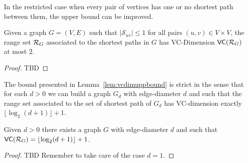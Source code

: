 In the restricted case when every pair of vertices has one or no shortest path
between them, the upper bound can be improved.
\begin{lemma}\label{lem:vcdimuppboundunique}
  Given a graph $G=(V,E)$ such that $|\mathcal{S}_{uv}|\le1$ for all pairs
  $(u,v)\in V\times V$, the range set $\mathcal{R}_G$ associated to the shortest
  paths in $G$ has VC-Dimension $\mathsf{VC}(\mathcal{R}_G)$ at most $2$.
\end{lemma}

\begin{proof}
  \XXX TBD \MR
\end{proof}

The bound presented in Lemma~\ref{lem:vcdimuppbound} is strict in the sense that
for each $d>0$ we can build a graph $G_d$ with edge-diameter $d$ and such
that the range set associated to the set of shortest path of $G_d$ has
VC-dimension exactly $\lfloor\log_2(d+1)\rfloor+1$.

\begin{lemma}
  Given $d>0$ there exists a graph $G$ with edge-diameter $d$ and such that
  $\mathsf{VC}(\mathcal{R}_G)=\lfloor\log_2(d+1)\rfloor+1$.
\end{lemma}

\begin{proof}
  \XXX TBD Remember to take care of the case $d=1$.
\end{proof}

